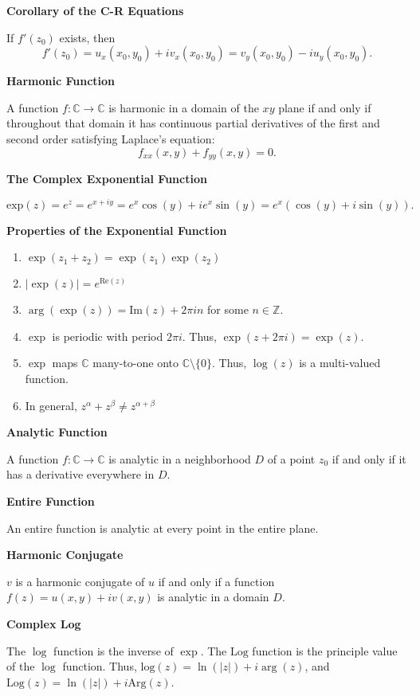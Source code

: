 \documentclass{article}
\newcommand{\C}{\mathbb C}
\begin{document}
\medskip\noindent\textbf{Corollary of the C-R Equations}

    If $f'(z_0)$ exists, then $$f'(z_0) = u_x(x_0, y_0) + iv_x(x_0, y_0) = v_y(x_0, y_0) - iu_y(x_0, y_0).$$

\medskip\noindent\textbf{Harmonic Function}

	A function $f: \C \to \C$ is harmonic in a domain of the $xy$ plane if and only if throughout that domain it has continuous partial derivatives of the first and second order satisfying Laplace's equation: $$f_{xx}(x,y) + f_{yy}(x,y)=0.$$

\medskip\noindent\textbf{The Complex Exponential Function}

	$$\text{exp}(z) = e^z = e^{x+iy} = e^x\cos(y) + ie^x\sin(y) = e^x(\cos(y)+i\sin(y)).$$

\medskip\noindent\textbf{Properties of the Exponential Function}
\begin{enumerate}
	\item $\exp(z_1 + z_2) = \exp(z_1)\exp(z_2)$
	\item $|\exp(z)| = e^{\text{Re}(z)}$
	\item $\arg(\exp(z)) = \text{Im}(z) + 2\pi in$ for some $n \in \mathbb Z$.
	\item $\exp$ is periodic with period $2\pi i$. Thus, $\exp(z+2\pi i) = \exp(z).$
	\item $\exp$ maps $\C$ many-to-one onto $\C \setminus \{0\}$. Thus, $\log(z)$ is a multi-valued function.
    \item In general, $z^\alpha + z^\beta \neq z^{\alpha + \beta}$
\end{enumerate}

\medskip\noindent\textbf{Analytic Function}

	A function $f: \C \to \C$ is analytic in a neighborhood $D$ of a point $z_0$ if and only if it has a derivative everywhere in $D$.

\medskip\noindent\textbf{Entire Function}

	An entire function is analytic at every point in the entire plane.

\medskip\noindent\textbf{Harmonic Conjugate}

	$v$ is a harmonic conjugate of $u$ if and only if a function $f(z)=u(x,y) + iv(x,y)$ is analytic in a domain $D$.

\medskip\noindent\textbf{Complex Log}

	The $\log$ function is the inverse of $\exp$. The $\text{Log}$ function is the principle value of the $\log$ function.
    Thus, $\text{log}(z) = \ln(|z|) + i\arg(z)$, and $\text{Log}(z) = \ln(|z|) + i\text{Arg}(z)$.
\end{document}
